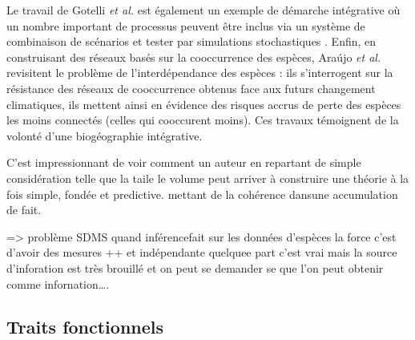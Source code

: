 Le travail de Gotelli \textit{et al.} est également un exemple de
démarche intégrative où un nombre important de processus peuvent être
inclus via un système de combinaison de scénarios et tester par
simulations stochastiques \cite{Gotelli2009}. Enfin, en construisant des
réseaux basés sur la cooccurrence des espèces, Araújo \textit{et al.}
revisitent le problème de l'interdépendance des espèces
\cite{Araujo2011} : ils s'interrogent sur la résistance des réseaux de
cooccurrence obtenus face aux futurs changement climatiques, ils mettent
ainsi en évidence des risques accrus de perte des espèces les moins
connectés (celles qui cooccurent moins). Ces travaux témoignent de la
volonté d'une biogéographie intégrative.

C'est impressionnant de voir comment un auteur en repartant de simple
considération telle que la taile le volume peut arriver à construire une
théorie à la fois simple, fondée et predictive. mettant de la cohérence
dansune accumulation de fait.

=\textgreater{} problème SDMS quand inférencefait sur les données
d'espèces la force c'est d'avoir des mesures ++ et indépendante quelquee
part c'est vrai mais la source d'inforation est très brouillé et on peut
se demander se que l'on peut obtenir comme infornation\ldots{}.

\subsection*{Traits fonctionnels}\label{traits-fonctionnels}

